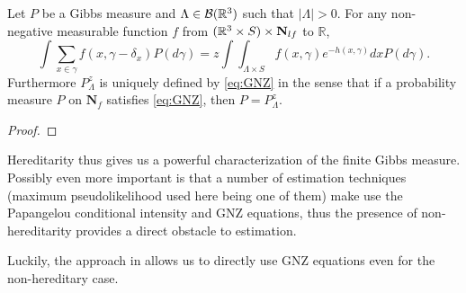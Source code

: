 \begin{proposition} Let $P$ be a Gibbs measure and $\Lambda \in \mathcal B({\mathbb R^3})$ such that $|\Lambda|>0$. For any non-negative measurable function $f$ from $({\mathbb R^3}\times S)\times \mathbf N_{lf}$ to $\mathbb R$,
	\begin{equation}\label{eq:GNZ}\int \sum_{x \in \gamma} f(x,\gamma- \delta_x) P(d\gamma) = z \int \int_{\Lambda\times S} f(x,\gamma) e^{-h(x,\gamma)} dx P (d\gamma).\end{equation}
	Furthermore $P^z_\Lambda$ is uniquely defined by \ref{eq:GNZ} in the sense that if a probability measure $P$ on $\mathbf N_f$ satisfies \ref{eq:GNZ}, then $P=P^z_\Lambda$.
\end{proposition}
\begin{proof}
\end{proof}

Hereditarity thus gives us a powerful characterization of the finite Gibbs measure. Possibly even more important is that a number of estimation techniques (maximum pseudolikelihood used here being one of them) make use the Papangelou conditional intensity and GNZ equations, thus the presence of non-hereditarity provides a direct obstacle to estimation.
 

Luckily, the approach in  \cite{DereudreLavancier2007} allows us to directly use GNZ equations even for the non-hereditary case. 

% 
% 
% 


